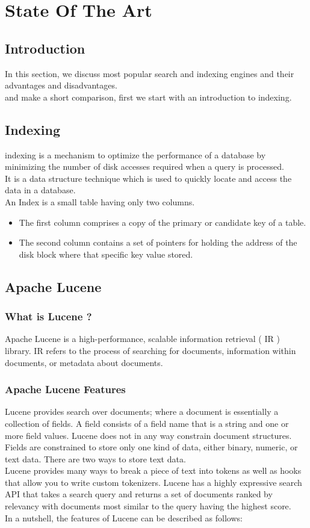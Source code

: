 \chapter{State Of The Art}

\section{Introduction}
In this section, we discuss most popular search and indexing engines and their advantages and disadvantages.\\
and make a short comparison, first we start with an introduction to indexing.
 

\section{Indexing}

indexing is a mechanism to optimize the performance of a database by minimizing the number of disk accesses required when a query is processed. \\
It is a data structure technique which is used to quickly locate and access the data in a database.\\
An Index is a small table having only two columns.
\begin{itemize}
    \item The first  column comprises a copy of the primary or candidate key of a table.
    \item The second column contains a set of pointers for holding the address of the disk block where that specific key value stored.
\end{itemize}

\section{Apache Lucene}
\subsection{What is Lucene ?}
Apache Lucene is a high-performance, scalable information retrieval ( IR ) library. IR refers to
the process of searching for documents, information within documents, or metadata
about documents.

\subsection{Apache Lucene Features}
Lucene provides search over documents; where a document is essentially a collection of fields. 
A field consists of a field name that is a string and one or more field values.
Lucene does not in any way constrain document structures. Fields are constrained to store only one kind of data, either binary, numeric, or text data. There are two ways to store text data.\\
Lucene provides many ways to break a piece of text into tokens as well as hooks that allow you to write custom tokenizers. Lucene has a highly expressive search API that takes a search query and returns a set of documents ranked by relevancy with documents most similar to the query having the highest score.\\
In a nutshell, the features of Lucene can be described as follows:
